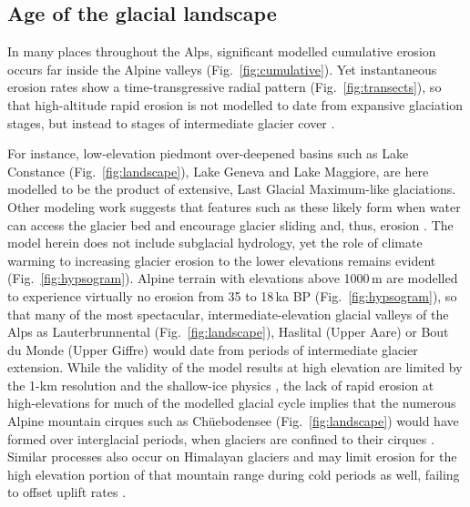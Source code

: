 \documentclass[esurf, manuscript]{copernicus}
\begin{document}
\subsection{Age of the glacial landscape}

    In many places throughout the Alps, significant modelled cumulative erosion
    occurs far inside the Alpine valleys (Fig.~\ref{fig:cumulative}). Yet
    instantaneous erosion rates show a time-transgressive radial pattern
    (Fig.~\ref{fig:transects}), so that high-altitude rapid erosion is not
    modelled to date from expansive glaciation stages, but instead to stages of
    intermediate glacier cover
    \citep[Fig.~\ref{fig:hypsogram};][]{Barr.etal.2019}.

    For instance, low-elevation piedmont over-deepened basins such as Lake
    Constance (Fig.~\ref{fig:landscape}), Lake Geneva and Lake Maggiore, are
    here modelled to be the product of extensive, Last Glacial Maximum-like
    glaciations. Other modeling work suggests that features such as these
    likely form when water can access the glacier bed and encourage glacier
    sliding and, thus, erosion \citep{Herman.etal.2011}. The model herein does
    not include subglacial hydrology, yet the role of climate warming to
    increasing glacier erosion to the lower elevations remains evident
    (Fig.~\ref{fig:hypsogram}).
    Alpine terrain with elevations above 1000\,m are modelled to
    experience virtually no erosion from 35 to 18\,ka BP
    (Fig.~\ref{fig:hypsogram}), so that many of the most spectacular,
    intermediate-elevation glacial valleys of the Alps as Lauterbrunnental
    (Fig.~\ref{fig:landscape}), Haslital (Upper Aare) or Bout du Monde (Upper
    Giffre) would date from periods of intermediate glacier extension.
    While the validity of the model results at high elevation are
    limited by the 1-km resolution and the shallow-ice physics
    \citep{Imhof.etal.2019}, the lack of rapid erosion at high-elevations for much
    of the modelled glacial cycle implies that the numerous Alpine mountain
    cirques such as Ch\"uebodensee (Fig.~\ref{fig:landscape}) would have formed
    over interglacial periods, when glaciers are confined to their cirques
    \citep{Barr.etal.2017, Barr.etal.2019}. Similar processes also occur on
    Himalayan glaciers and may limit erosion for the high elevation portion of
    that mountain range during cold periods as well, failing to offset uplift
    rates \citep{Harper.Humphrey.2003}.
\end{document}
